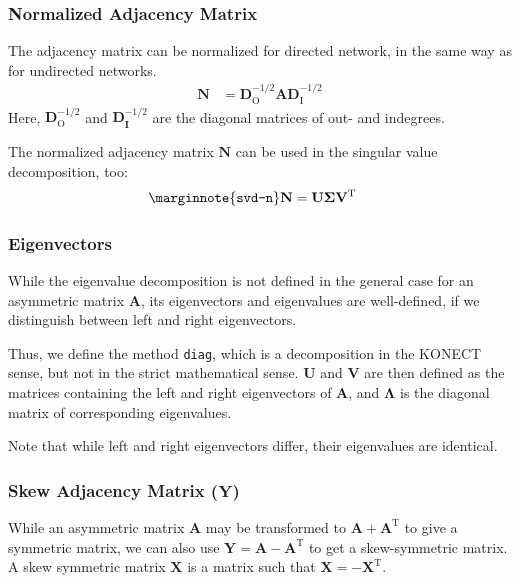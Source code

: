 \documentclass{article}
\begin{document}
\subsubsection{Normalized Adjacency Matrix}
The adjacency matrix can be normalized for directed network, in the same
way as for undirected networks.
\begin{align}
  \mathbf N &= \mathbf D_{\mathrm O}^{-1/2} \mathbf A \mathbf D_{\mathrm I}^{-1/2}
\end{align}
Here, $\mathbf D_{\mathrm O}^{-1/2}$ and $\mathbf D_{\mathbf I}^{-1/2}$
are the diagonal matrices of out- and indegrees. 

The normalized adjacency matrix $\mathbf N$ can be used in the singular
value decomposition, too:
\begin{align}
  \marginnote{\texttt{svd-n}}
  \mathbf N &= \mathbf U \mathbf \Sigma \mathbf V^{\mathrm T}
\end{align}

\subsubsection{Eigenvectors}
While the eigenvalue decomposition is not defined in the general case
for an asymmetric matrix $\mathbf A$, its eigenvectors and eigenvalues
are well-defined, if we distinguish between left and right
eigenvectors.

Thus, we define the method \texttt{diag}, which is a decomposition in
the KONECT sense, but not in the strict mathematical sense. 
$\mathbf U$ and $\mathbf V$ are then defined as the matrices containing
the left and right eigenvectors of $\mathbf A$, and $\mathbf \Lambda$ is
the diagonal matrix of corresponding eigenvalues. 

Note that while left and right eigenvectors differ, their eigenvalues
are identical. 

\subsubsection{Skew Adjacency Matrix ($\mathbf Y$)}
While an asymmetric matrix $\mathbf A$ may be transformed to $\mathbf A
+ \mathbf A^{\mathrm T}$ to give a symmetric matrix, we can also use
$\mathbf Y = \mathbf A - \mathbf A^{\mathrm T}$ to get a skew-symmetric matrix.  A
skew symmetric matrix $\mathbf X$ is a matrix such that $\mathbf X =
-\mathbf X^{\mathrm T}$.
\end{document}
